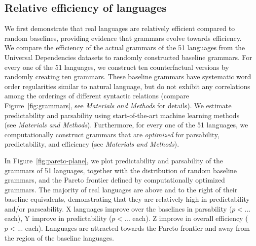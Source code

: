 \documentclass[9pt,twocolumn,twoside,lineno]{pnas-new}
\begin{document}
\subsection{Relative efficiency of languages}
\label{sec:relative-efficiency}



We first demonstrate that real languages are relatively efficient compared to random baselines, providing evidence that grammars evolve towards efficiency.
We compare the efficiency of the actual grammars of the 51 languages from the Universal Dependencies datasets to randomly constructed baseline grammars.
For every one of the 51 languages, we construct ten counterfactual versions by randomly creating ten grammars.
These baseline grammars have systematic word order regularities similar to natural language, but do not exhibit any correlations among the orderings of different syntactic relations (compare Figure~\ref{fig:grammars}, see \textit{Materials and Methods} for details).
We estimate predictability and parsability using start-of-the-art machine learning methods (see \textit{Materials and Methods}).
Furthermore, for every one of the 51 languages, we computationally construct grammars that are \emph{optimized} for parsability, predictability, and efficiency (see \textit{Materials and Methods}).

In Figure~\ref{fig:pareto-plane}, we plot predictability and parsability of the grammars of 51 languages, together with the distribution of random baseline grammars, and the Pareto frontier defined by computationally optimized grammars.
The majority of real languages are above and to the right of their baseline equivalents, demonstrating that they are relatively high in predictability and/or parseability.
X languages improve over the baselines in parsability ($p < ...$ each), Y improve in predictability ($p < ...$ each).
Z improve in overall efficiency ($p < ...$ each).
Languages are attracted towards the Pareto frontier and away from the region of the baseline languages.

\end{document}
